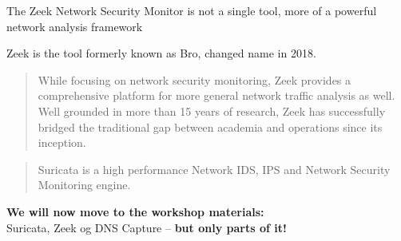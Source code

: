 \documentclass[Screen16to9,17pt]{foils}
\begin{document}

The Zeek Network Security Monitor is not a single tool, more of a
powerful network analysis framework

Zeek is the tool formerly known as Bro, changed name in 2018. 




\begin{quote}
While focusing on network security monitoring, Zeek provides a comprehensive platform for more general network traffic analysis as well. Well grounded in more than 15 years of research, Zeek has successfully bridged the traditional gap between academia and operations since its inception.
\end{quote}




\begin{quote}
Suricata is a high performance Network IDS, IPS and Network Security Monitoring engine.
\end{quote}


{\bf We will now move to the workshop materials:}\\
Suricata, Zeek og DNS Capture -- {\bf but only parts of it!}\\
{\small{}}



\slidenext
\end{document}
